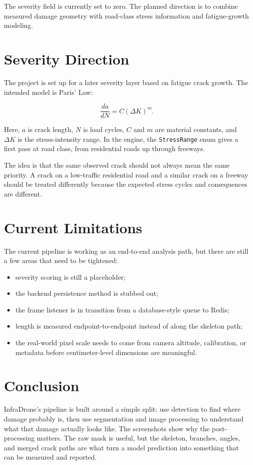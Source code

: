 \documentclass[11pt]{article}
\begin{document}
The severity field is currently set to zero. The planned direction is to combine measured damage geometry with road-class stress information and fatigue-growth modeling.

\section{Severity Direction}

The project is set up for a later severity layer based on fatigue crack growth. The intended model is Paris' Law:

\[
\frac{da}{dN} = C(\Delta K)^m.
\]

Here, \(a\) is crack length, \(N\) is load cycles, \(C\) and \(m\) are material constants, and \(\Delta K\) is the stress-intensity range. In the engine, the \texttt{StressRange} enum gives a first pass at road class, from residential roads up through freeways.

The idea is that the same observed crack should not always mean the same priority. A crack on a low-traffic residential road and a similar crack on a freeway should be treated differently because the expected stress cycles and consequences are different.

\section{Current Limitations}

The current pipeline is working as an end-to-end analysis path, but there are still a few areas that need to be tightened:

\begin{itemize}
    \item severity scoring is still a placeholder;
    \item the backend persistence method is stubbed out;
    \item the frame listener is in transition from a database-style queue to Redis;
    \item length is measured endpoint-to-endpoint instead of along the skeleton path;
    \item the real-world pixel scale needs to come from camera altitude, calibration, or metadata before centimeter-level dimensions are meaningful.
\end{itemize}

\section{Conclusion}

InfraDrone's pipeline is built around a simple split: use detection to find where damage probably is, then use segmentation and image processing to understand what that damage actually looks like. The screenshots show why the post-processing matters. The raw mask is useful, but the skeleton, branches, angles, and merged crack paths are what turn a model prediction into something that can be measured and reported.
\end{document}
